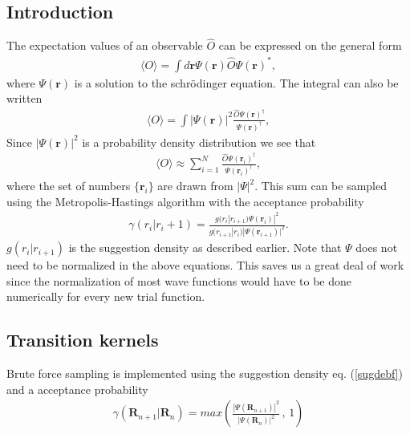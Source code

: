 \documentclass[a4paper,10pt,twocolumn]{article} %
\newcommand{\ts}[1]{\textbf{#1}}
\newcommand{\expec}[1]{\langle{}{#1}\rangle{}}
\begin{document}
\subsection{Introduction}%

The expectation values of an observable $\hat O$ can be expressed on the general form
\begin{align}
	\expec{ O } = \int d\ts r \Psi(\ts r) \hat O \Psi(\ts r)^*,\label{exv}
\end{align}
where $\Psi(\ts r)$ %
is a solution to the schrödinger equation. 
The integral can also be written 
\begin{align}
	\expec{ O } = \int |\Psi(\ts r)|^2 \frac{ \hat O \Psi(\ts r)^\dagger } {\Psi(\ts r)^\dagger},
\end{align}
Since $|\Psi(\ts r)|^2$ is a probability density distribution we see that
\begin{align}
	\expec{ O } \approx \sum_{i=1}^N \frac{ \hat O \Psi(\ts r_i)^\dagger } {\Psi(\ts r_i)^\dagger}, \label{RFQMC1} 
\end{align}
%
where the set of numbers $\{\ts r_i\}$ are drawn from $|\Psi|^2$.
This sum can be sampled using the Metropolis-Hastings algorithm with the acceptance probability 
\begin{align}
	\gamma(r_i|r_i+1)=\frac
		{g(r_i|r_{i+1})\Psi(\ts r_i)|^2}
		{g(r_{i+1}|r_i)|\Psi(\ts r_{i+1})|^2}.
\end{align} 
$g(r_i|r_{i+1})$ is the suggestion density as described earlier.
%
Note that $\Psi$ does not need to be normalized in the above equations. This saves us a great deal of work since the normalization 
of most wave functions would have to be done numerically for every new trial function.%

\subsection{Transition kernels}%
Brute force sampling is implemented using the suggestion density eq. (\ref{sugdebf}) and a acceptance probability
\begin{align} 
	\gamma(\ts R_{n+1}|\ts R_n)=max\left(
	\frac
	{|\Psi(\ts R_{n+1})|^2}
    {|\Psi(\ts R_n)|^2}\, 
	,\, 1 \right) 
\end{align}
 
\end{document}
